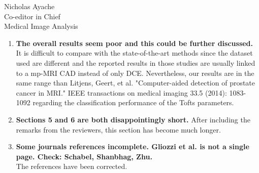 \documentclass{letter}
\begin{document}
\begin{letter}{Nicholas Ayache \\ Co-editor in Chief \\ Medical Image Analysis}
\begin{enumerate}
{      to indicate which differences are statistically
      significant. ``Significant'' is mentioned in the conclusions, but
      there is no evidence for this.}\\
    We added a Wilcoxon significance test - see Fig.\,7. Now, the term
    significant is only used for $p<0.05$.
  \item \textbf{The overall results seem poor and this could be
      further discussed.}\\
    It is difficult to compare with the state-of-the-art methods since
    the dataset used are different and the reported results in those
    studies are usually linked to a mp-MRI CAD instead of only
    DCE. Nevertheless, our results are in the same range than Litjens,
    Geert, et al. "Computer-aided detection of prostate cancer in
    MRI." IEEE transactions on medical imaging 33.5 (2014):
    1083-1092 regarding the classification performance of the Tofts
    parameters.
  \item \textbf{Sections 5 and 6 are both disappointingly short.}
    After including the remarks from the reviewers, this section has
    become much longer.
  \item \textbf{Some journals references incomplete. Gliozzi et al. is
      not a single page. Check: Schabel, Shanbhag, Zhu.}\\
    The references have been corrected.
  \end{enumerate}


\end{letter}
\end{document}
